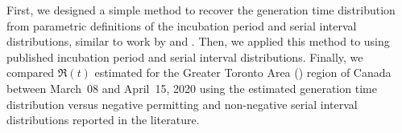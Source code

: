 First, we designed a simple method to
recover the generation time distribution
from parametric definitions of
the incubation period and serial interval distributions,
similar to work by \textcite{Kuk2005} and \textcite{Britton2019}.
Then, we applied this method to \covid using
published incubation period and serial interval distributions.
Finally, we compared $\Re(t)$ estimated for
the Greater Toronto Area (\gta) region of Canada
between March~08 and April~15, 2020 using
the estimated generation time distribution versus
negative permitting and non-negative serial interval distributions
reported in the literature.
